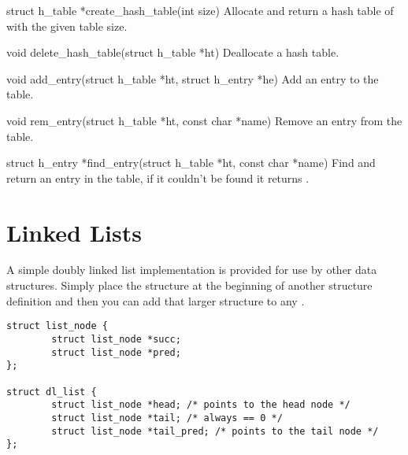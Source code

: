 \begin{cprototypelist}
  \item[struct h_table *create_hash_table(int size)] Allocate and
  return a hash table of with the given table size.

  \item[void delete_hash_table(struct h_table *ht)] Deallocate a
  hash table.

  \item[void add_entry(struct h_table *ht, struct h_entry *he)]
  Add an entry to the table.

  \item[void rem_entry(struct h_table *ht, const char *name)]
  Remove an entry from the table.

  \item[struct h_entry *find_entry(struct h_table *ht, const char
  *name)]  Find and return an entry in the table, if it couldn't be found it
  returns .
\end{cprototypelist}



\section{Linked Lists}
\label{sec:libcompiler:Linked Lists}

A simple doubly linked list implementation is provided for use by other data
structures.  Simply place the  structure at the beginning of
another structure definition and then you can add that larger structure to any
.

\begin{verbatim}
struct list_node {
        struct list_node *succ;
        struct list_node *pred;
};

struct dl_list {
        struct list_node *head; /* points to the head node */
        struct list_node *tail; /* always == 0 */
        struct list_node *tail_pred; /* points to the tail node */
};
\end{verbatim}

